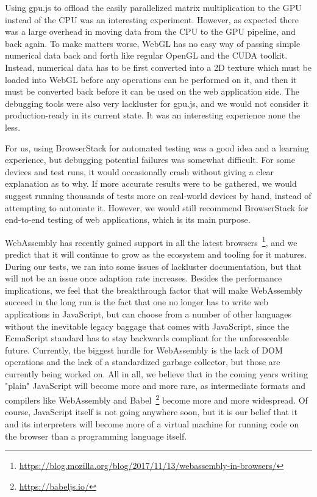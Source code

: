 \documentclass[conference]{IEEEtran}
\begin{document}
Using gpu.js to offload the easily parallelized matrix multiplication to the
GPU instead of the CPU was an interesting experiment. However, as expected
there was a large overhead in moving data from the CPU to the GPU
pipeline, and back again. To make matters worse, WebGL has no easy way of
passing simple numerical data back and forth like regular OpenGL and the
CUDA toolkit. Instead, numerical data has to be first converted into a 2D
texture which must be loaded into WebGL before any operations can be performed
on it, and then it must be converted back before it can be used on the web
application side. The debugging tools were also very lackluster for gpu.js, and
we would not consider it production-ready in its current state. It was an
interesting experience none the less.

For us, using BrowserStack for automated testing was a good idea and a learning
experience, but debugging potential failures was somewhat difficult. For some
devices and test runs, it would occasionally crash without giving a clear
explanation as to why. If more accurate results were to be gathered, we would
suggest running thousands of tests more on real-world devices by hand, instead
of attempting to automate it. However, we would still recommend BrowserStack
for end-to-end testing of web applications, which is its main purpose.

WebAssembly has recently gained support in all the latest
browsers~\footnote{\url{https://blog.mozilla.org/blog/2017/11/13/webassembly-in-browsers/}},
and we predict that it will continue to grow as the ecosystem and tooling for
it matures. During our tests, we ran into some issues of lackluster
documentation, but that will not be an issue once adaption rate increases.
Besides the performance implications, we feel that the breakthrough factor that
will make WebAssembly succeed in the long run is the fact that one no longer
has to write web applications in JavaScript, but can choose from a
number of other languages without the inevitable legacy baggage that comes with
JavaScript, since the EcmaScript standard has to stay backwards compliant for
the unforeseeable future. Currently, the biggest hurdle for WebAssembly is the
lack of DOM operations and the lack of a standardized garbage collector, but
those are currently being worked on. All in all, we believe that in the coming
years writing "plain" JavaScript will become more and more rare, as
intermediate formats and compilers like WebAssembly and
Babel~\footnote{\url{https://babeljs.io/}} become more and more widespread. Of
course, JavaScript itself is not going anywhere soon, but it is our belief that
it and its interpreters will become more of a virtual machine for running code
on the browser than a programming language itself.



\end{document}
